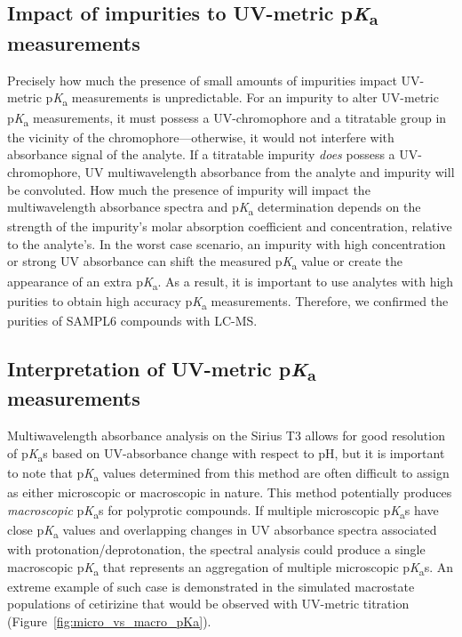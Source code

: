 \documentclass[9pt,lineno]{elife}
\newcommand{\pKa}{p\textit{K}\textsubscript{a}}
\begin{document}
\subsection{Impact of impurities to UV-metric \pKa{} measurements}

Precisely how much the presence of small amounts of impurities impact UV-metric \pKa{} measurements is unpredictable. 
For an impurity to alter UV-metric \pKa{} measurements, it must possess a UV-chromophore and a titratable group in the vicinity of the chromophore---otherwise, it would not interfere with absorbance signal of the analyte. 
If a titratable impurity \emph{does} possess a UV-chromophore, UV multiwavelength absorbance from the analyte and impurity will be convoluted. 
How much the presence of impurity will impact the multiwavelength absorbance spectra and \pKa{} determination depends on the strength of the impurity's molar absorption coefficient and concentration, relative to the analyte's. 
In the worst case scenario, an impurity with high concentration or strong UV absorbance can shift the measured \pKa{} value or create the appearance of an extra \pKa. 
As a result, it is important to use analytes with high purities to obtain high accuracy \pKa{} measurements. 
Therefore, we confirmed the purities of SAMPL6 compounds with LC-MS.   

\subsection{Interpretation of UV-metric \pKa{} measurements}

Multiwavelength absorbance analysis on the Sirius T3 allows for good resolution of \pKa{}s based on UV-absorbance change with respect to pH, but it is important to note that \pKa{} values determined from this method are often difficult to assign as either microscopic or macroscopic in nature. This method potentially produces \emph{macroscopic} \pKa{}s for polyprotic compounds. 
If multiple microscopic \pKa{}s have close \pKa{} values and overlapping changes in UV absorbance spectra associated with protonation/deprotonation, the spectral analysis could produce a single macroscopic \pKa{} that represents an aggregation of multiple microscopic \pKa{}s. 
An extreme example of such case is demonstrated in the simulated macrostate populations of cetirizine that would be observed with UV-metric titration (Figure~\ref{fig:micro_vs_macro_pKa}).
\end{document}

